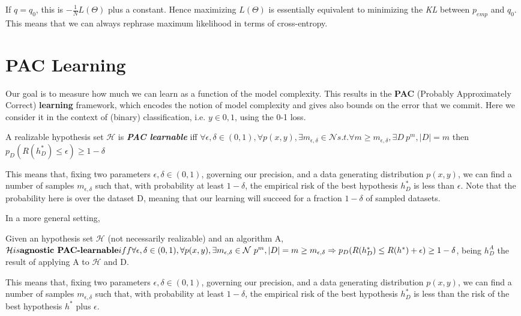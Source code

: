 If $q = q_0$, this is $-\frac{1}{N}L(\Theta)$ plus a constant. Hence maximizing $L(\Theta)$ is essentially equivalent to minimizing the \textit{KL} between $p_{emp}$ and $q_0$. This means that we can always rephrase maximum likelihood in terms of cross-entropy.


\section{PAC Learning}
Our goal is to measure how much we can learn as a function of the model complexity. This results in the \textbf{PAC} (Probably Approximately Correct) \textbf{learning} framework, which encodes the notion of model complexity and gives also bounds on the error that we commit. 
Here we consider it in the context of (binary) classification, i.e. $y \in {0,1}$, using the 0-1 loss. 

\begin{definitionblock}
    A realizable hypothesis set $\mathcal{H}$ is \textbf{\textit{PAC learnable}} iff $\forall \epsilon, \delta \in (0,1), \forall p(x,y), \exists m_{\epsilon, \delta} \in \mathcal{N} s.t. \forall m \geq m_{\epsilon, \delta}, \exists D ~ p^m, |D| = m$ then $p_D(R(h^*_D) \leq \epsilon) \geq 1 - \delta$
\end{definitionblock}

This means that, fixing two parameters $\epsilon, \delta \in (0,1)$, governing our precision, and a data generating distribution $p(x,y)$, we can find a number of samples $m_{\epsilon, \delta}$ such that, with probability at least $1 - \delta$, the empirical risk of the best hypothesis $h^*_D$ is less than $\epsilon$. Note that the probability here is over the dataset D, meaning that our learning will succeed for a fraction $1 - \delta$ of sampled datasets. 

In a more general setting, 
\begin{definitionblock}
Given an hypothesis set $\mathcal{H}$ (not necessarily realizable) and an algorithm A, 
$\mathcal{H} is \text{\textbf{agnostic PAC-learnable}} iff \forall \epsilon, \delta \in (0,1), 
\forall p(x,y), \exists m_{\epsilon, \delta} \in \mathcal{N} ~ p^m, 
|D|  = m \geq m_{\epsilon, \delta} \Rightarrow p_D(R(h^*_D) \leq R(h^*) + \epsilon) \geq 1 - \delta$, 
being $h^A_D$ the result of applying A to $\mathcal{H}$ and D.
\end{definitionblock}

This means that, fixing two parameters $\epsilon, \delta \in (0,1)$, governing our precision, and a data generating distribution $p(x,y)$, we can find a number of samples $m_{\epsilon, \delta}$ such that, with probability at least $1 - \delta$, the empirical risk of the best hypothesis $h^*_D$ is less than the risk of the best hypothesis $h^*$ plus $\epsilon$.

